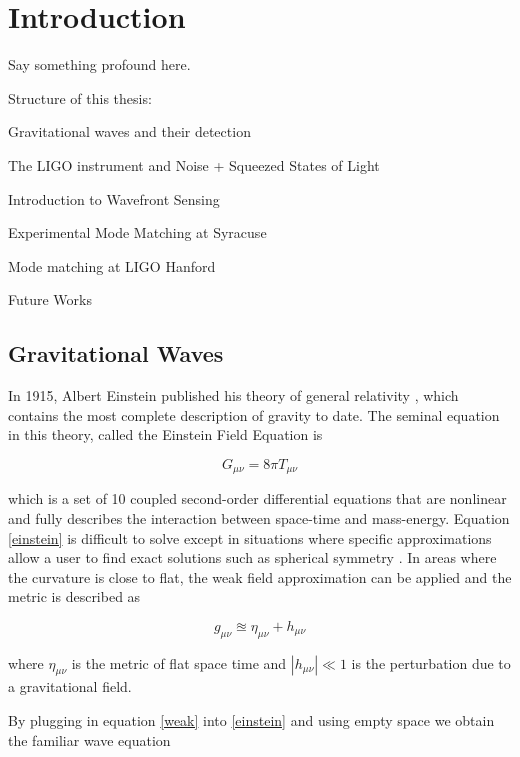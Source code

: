 \chapter{Introduction}

	Say something profound here.
	
	Structure of this thesis:
	
		Gravitational waves and their detection
	
		The LIGO instrument and Noise + Squeezed States of Light
	
		Introduction to Wavefront Sensing
	
		Experimental Mode Matching at Syracuse
	
		Mode matching at LIGO Hanford
	
		Future Works

	\section{Gravitational Waves}\label{gravitational waves}
	In 1915, Albert Einstein published his theory of general relativity \cite{einstein}, which contains the most complete description of gravity to date. The seminal equation in this theory, called the Einstein Field Equation is
	
	\begin{equation} \label{einstein}
	G_{\mu \nu} = 8 \pi T_{\mu \nu}
	\end{equation}
	
	which is a set of 10 coupled second-order differential equations that are nonlinear and fully describes the interaction between space-time and mass-energy. Equation \ref{einstein} is difficult to solve except in situations where specific approximations allow a user to find exact solutions such as spherical symmetry \cite{carroll_2003} \cite{schutz_2009}. In areas where the curvature is close to flat,  the weak field approximation can be applied and the metric is described as	
	
	\begin{equation} \label{weak}
	g_{\mu \nu}  \approxeq \eta_{\mu \nu} + h_{\mu \nu}
	\end{equation}
	
	where $\eta_{\mu \nu}$ is the metric of flat space time and $|h_{\mu \nu}| \ll 1$ is the perturbation due to a gravitational field.
	
	By plugging in equation \ref{weak} into \ref{einstein} and using empty space we obtain the familiar wave equation
	

